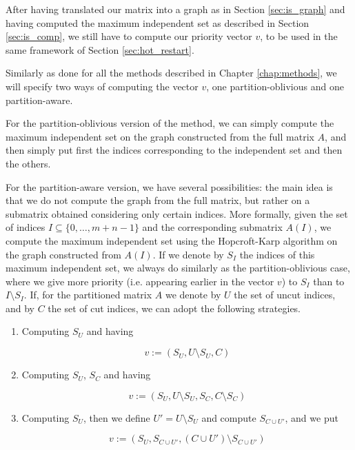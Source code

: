 After having translated our matrix into a graph as in Section \ref{sec:is_graph} and having computed the maximum independent set as described in Section \ref{sec:is_comp}, we still have to compute our priority vector $v$, to be used in the same framework of Section \ref{sec:hot_restart}.

Similarly as done for all the methods described in Chapter \ref{chap:methods}, we will specify two ways of computing the vector $v$, one partition-oblivious and one partition-aware.

For the partition-oblivious version of the method, we can simply compute the maximum independent set on the graph constructed from the full matrix $A$, and then simply put first the indices corresponding to the independent set and then the others.

For the partition-aware version, we have several possibilities: the main idea is that we do not compute the graph from the full matrix, but rather on a submatrix obtained considering only certain indices. More formally, given the set of indices $I \subseteq \{ 0,\dots,m+n-1\}$ and the corresponding submatrix $A(I)$, we compute the maximum independent set using the Hopcroft-Karp algorithm on the graph constructed from $A(I)$. If we denote by $S_I$ the indices of this maximum independent set, we always do similarly as the partition-oblivious case, where we give more priority (i.e. appearing earlier in the vector $v$) to $S_I$ than to $I \setminus S_I$. If, for the partitioned matrix $A$ we denote by $U$ the set of uncut indices, and by $C$ the set of cut indices, we can adopt the following strategies.

\begin{enumerate}
	\item Computing $S_U$ and having 
		
		$$v := (S_U,U \setminus S_U, C)$$

	\item Computing $S_U$, $S_C$ and having

		$$v := (S_U, U \setminus S_U, S_C, C \setminus S_C)$$

	\item Computing $S_U$, then we define $U' = U \setminus S_U$ and compute $S_{C \cup U'}$, and we put

		\[
			v:= (S_U, S_{C \cup U'}, (C \cup U') \setminus S_{C \cup U'})
		\]
\end{enumerate}


